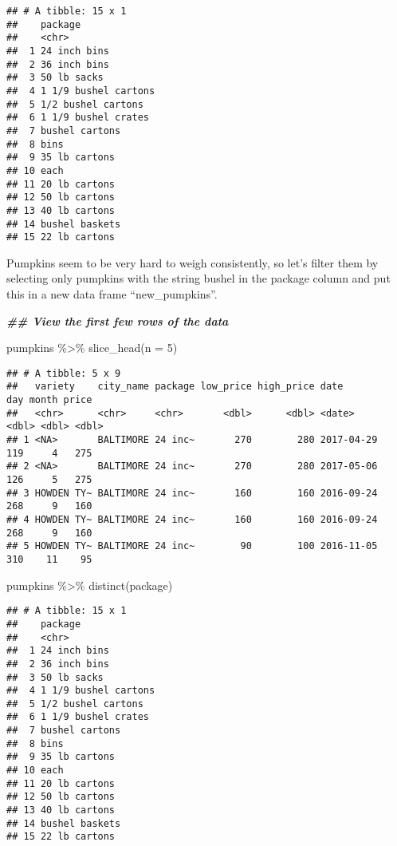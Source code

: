 \documentclass[
]{article}
\newenvironment{Shaded}{\begin{snugshade}}{\end{snugshade}}
\newcommand{\AttributeTok}[1]{\textcolor[rgb]{0.77,0.63,0.00}{#1}}
\newcommand{\DecValTok}[1]{\textcolor[rgb]{0.00,0.00,0.81}{#1}}
\newcommand{\DocumentationTok}[1]{\textcolor[rgb]{0.56,0.35,0.01}{\textbf{\textit{#1}}}}
\newcommand{\FunctionTok}[1]{\textcolor[rgb]{0.00,0.00,0.00}{#1}}
\newcommand{\NormalTok}[1]{#1}
\newcommand{\SpecialCharTok}[1]{\textcolor[rgb]{0.00,0.00,0.00}{#1}}
\begin{document}
\begin{verbatim}
## # A tibble: 15 x 1
##    package             
##    <chr>               
##  1 24 inch bins        
##  2 36 inch bins        
##  3 50 lb sacks         
##  4 1 1/9 bushel cartons
##  5 1/2 bushel cartons  
##  6 1 1/9 bushel crates 
##  7 bushel cartons      
##  8 bins                
##  9 35 lb cartons       
## 10 each                
## 11 20 lb cartons       
## 12 50 lb cartons       
## 13 40 lb cartons       
## 14 bushel baskets      
## 15 22 lb cartons
\end{verbatim}

Pumpkins seem to be very hard to weigh consistently, so let's filter
them by selecting only pumpkins with the string bushel in the package
column and put this in a new data frame ``new\_pumpkins''.

\begin{Shaded}
\begin{Highlighting}[]
\DocumentationTok{\#\# View the first few rows of the data}

\NormalTok{pumpkins }\SpecialCharTok{\%\textgreater{}\%} \FunctionTok{slice\_head}\NormalTok{(}\AttributeTok{n =} \DecValTok{5}\NormalTok{)}
\end{Highlighting}
\end{Shaded}

\begin{verbatim}
## # A tibble: 5 x 9
##   variety    city_name package low_price high_price date         day month price
##   <chr>      <chr>     <chr>       <dbl>      <dbl> <date>     <dbl> <dbl> <dbl>
## 1 <NA>       BALTIMORE 24 inc~       270        280 2017-04-29   119     4   275
## 2 <NA>       BALTIMORE 24 inc~       270        280 2017-05-06   126     5   275
## 3 HOWDEN TY~ BALTIMORE 24 inc~       160        160 2016-09-24   268     9   160
## 4 HOWDEN TY~ BALTIMORE 24 inc~       160        160 2016-09-24   268     9   160
## 5 HOWDEN TY~ BALTIMORE 24 inc~        90        100 2016-11-05   310    11    95
\end{verbatim}

\begin{Shaded}
\begin{Highlighting}[]
\NormalTok{pumpkins }\SpecialCharTok{\%\textgreater{}\%} \FunctionTok{distinct}\NormalTok{(package)}
\end{Highlighting}
\end{Shaded}

\begin{verbatim}
## # A tibble: 15 x 1
##    package             
##    <chr>               
##  1 24 inch bins        
##  2 36 inch bins        
##  3 50 lb sacks         
##  4 1 1/9 bushel cartons
##  5 1/2 bushel cartons  
##  6 1 1/9 bushel crates 
##  7 bushel cartons      
##  8 bins                
##  9 35 lb cartons       
## 10 each                
## 11 20 lb cartons       
## 12 50 lb cartons       
## 13 40 lb cartons       
## 14 bushel baskets      
## 15 22 lb cartons
\end{verbatim}
\end{document}
